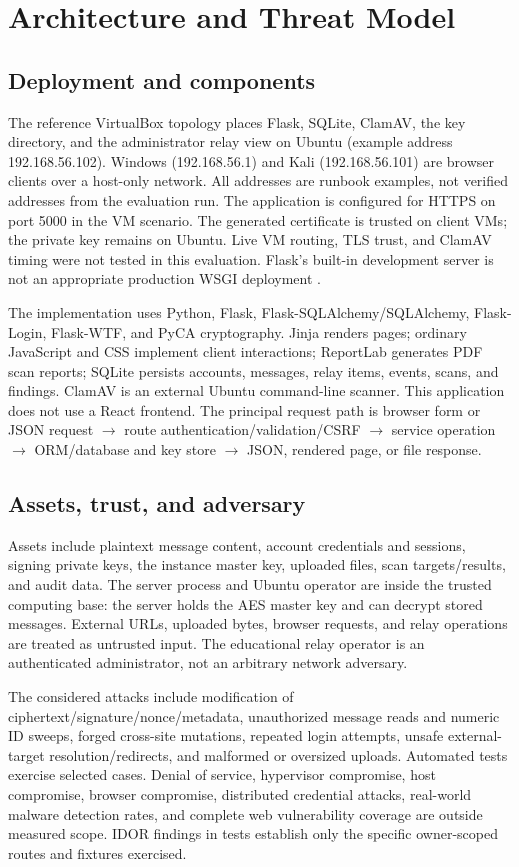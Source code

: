 \documentclass[conference]{IEEEtran}
\begin{document}
\section{Architecture and Threat Model}
\subsection{Deployment and components}
The reference VirtualBox topology places Flask, SQLite, ClamAV, the key directory, and the administrator relay view on Ubuntu (example address 192.168.56.102). Windows (192.168.56.1) and Kali (192.168.56.101) are browser clients over a host-only network. All addresses are runbook examples, not verified addresses from the evaluation run. The application is configured for HTTPS on port 5000 in the VM scenario. The generated certificate is trusted on client VMs; the private key remains on Ubuntu. Live VM routing, TLS trust, and ClamAV timing were not tested in this evaluation. Flask's built-in development server is not an appropriate production WSGI deployment \cite{flaskdeploy}.

The implementation uses Python, Flask, Flask-SQLAlchemy/SQLAlchemy, Flask-Login, Flask-WTF, and PyCA cryptography. Jinja renders pages; ordinary JavaScript and CSS implement client interactions; ReportLab generates PDF scan reports; SQLite persists accounts, messages, relay items, events, scans, and findings. ClamAV is an external Ubuntu command-line scanner. This application does not use a React frontend. The principal request path is browser form or JSON request $\rightarrow$ route authentication/validation/CSRF $\rightarrow$ service operation $\rightarrow$ ORM/database and key store $\rightarrow$ JSON, rendered page, or file response.

\subsection{Assets, trust, and adversary}
Assets include plaintext message content, account credentials and sessions, signing private keys, the instance master key, uploaded files, scan targets/results, and audit data. The server process and Ubuntu operator are inside the trusted computing base: the server holds the AES master key and can decrypt stored messages. External URLs, uploaded bytes, browser requests, and relay operations are treated as untrusted input. The educational relay operator is an authenticated administrator, not an arbitrary network adversary.

The considered attacks include modification of ciphertext/signature/nonce/metadata, unauthorized message reads and numeric ID sweeps, forged cross-site mutations, repeated login attempts, unsafe external-target resolution/redirects, and malformed or oversized uploads. Automated tests exercise selected cases. Denial of service, hypervisor compromise, host compromise, browser compromise, distributed credential attacks, real-world malware detection rates, and complete web vulnerability coverage are outside measured scope. IDOR findings in tests establish only the specific owner-scoped routes and fixtures exercised.
\end{document}

